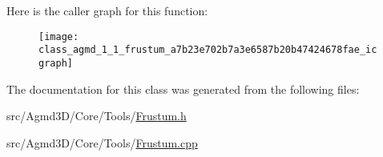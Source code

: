 Here is the caller graph for this function\+:\nopagebreak
\begin{figure}[H]
\begin{center}
\leavevmode
\texttt{[image: class\_agmd\_1\_1\_frustum\_a7b23e702b7a3e6587b20b47424678fae\_icgraph]}
\end{center}
\end{figure}




The documentation for this class was generated from the following files\+:\begin{DoxyCompactItemize}
\item 
src/\+Agmd3\+D/\+Core/\+Tools/\hyperlink{_frustum_8h}{Frustum.\+h}\item 
src/\+Agmd3\+D/\+Core/\+Tools/\hyperlink{_frustum_8cpp}{Frustum.\+cpp}\end{DoxyCompactItemize}

